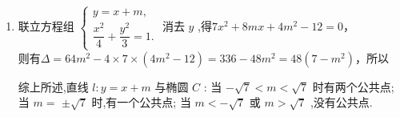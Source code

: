 \begin{enumerate}
\begin{jieda}
\begin{enumerate}
            \item 联立方程组 $\left\{  \begin{array}{l} 
                y = x + m, \\  \dfrac{{x}^{2}}{4} + \dfrac{{y}^{2}}{3} = 1. \end{array}\right.$ 消去 $y$ ,得$7{x}^{2} + {8mx} + 4{m}^{2} - {12} = 0$， \\
                则有$\Delta  = {64}{m}^{2} - 4 \times  7 \times  \left( {4{m}^{2} - {12}}\right)  = {336} - {48}{m}^{2} = {48}\left( {7 - {m}^{2}}\right)$，所以
                综上所述,直线 $l : y = x + m$ 与椭圆 $C$ :  当 $- \sqrt{7} < m < \sqrt{7}$ 时有两个公共点;  当 $m =$  $\pm  \sqrt{7}$ 时,有一个公共点;  当 $m <  - \sqrt{7}$ 或 $m > \sqrt{7}$ ,没有公共点.
        \end{enumerate}
    \end{jieda}


\end{enumerate}

